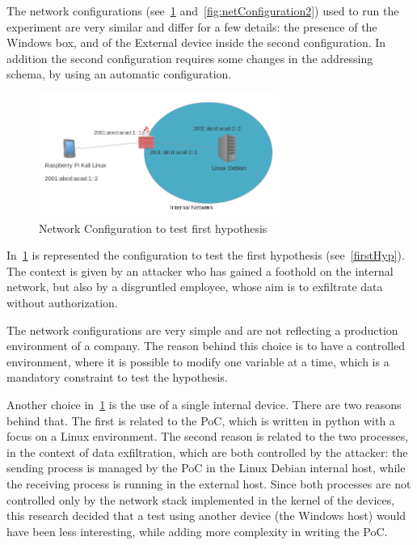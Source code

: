 \documentclass[12pt]{article}
\begin{document}
The network configurations (see~\cref{fig:netConfiguration1} and~\cref{fig:netConfiguration2}) used to run the experiment are very similar and differ for a few details: the presence of the Windows box, and of the External device inside the second configuration. In addition the second configuration requires some changes in the addressing schema, by using an automatic configuration.


\begin{figure}[ht] 
\begin{center}
\includegraphics[width=0.7\textwidth]{networkTopology1}
\caption{Network Configuration to test first hypothesis}
\label{fig:netConfiguration1}
\end{center}
\end{figure}

In~\cref{fig:netConfiguration1} is represented the configuration to test the first hypothesis (see~\ref{firstHyp}). The context is given by an attacker who has gained a foothold on the internal network, but also by a disgruntled employee, whose aim is to exfiltrate data without authorization.

The network configurations are very simple and are not reflecting a production environment of a company. The reason behind this choice is to have a controlled environment, where it is possible to modify one variable at a time, which is a mandatory constraint to test the hypothesis.

Another choice in~\cref{fig:netConfiguration1} is the use of a single internal device. There are two reasons behind that. The first is related to the PoC, which is written in python with a focus on a Linux environment. The second reason is related to the two processes, in the context of data exfiltration, which are both controlled by the attacker: the sending process is managed by the PoC in the Linux Debian internal host, while the receiving process is running in the external host. Since both processes are not controlled only by the network stack implemented in the kernel of the devices, this research decided that a test using another device (the Windows host) would have been less interesting, while adding more complexity in writing the PoC.
\end{document}
